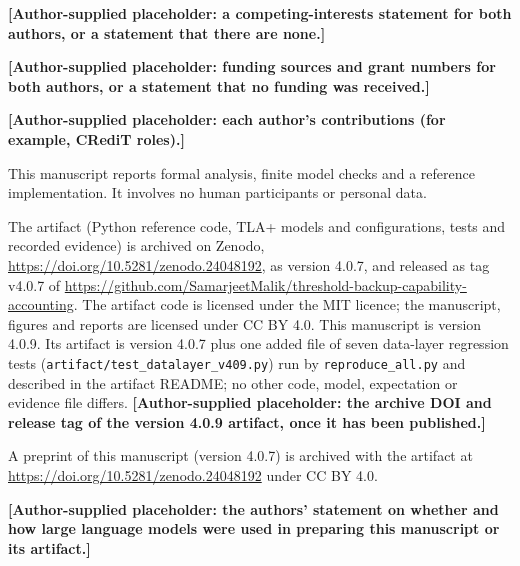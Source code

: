 \documentclass[pdflatex,sn-mathphys-num,twocolumn]{sn-jnl}
\theoremstyle{plain}
\theoremstyle{definition}
\newcommand{\code}[1]{\texttt{#1}}
\newcommand{\authorinput}[1]{\textbf{[Author-supplied placeholder: #1.]}}
\begin{document}
\authorinput{a competing-interests statement for both authors, or a statement that there are none}

\authorinput{funding sources and grant numbers for both authors, or a statement that no funding was received}

\authorinput{each author's contributions (for example, CRediT roles)}

This manuscript reports formal analysis, finite model checks and a reference implementation. It involves no human participants or personal data.

The artifact (Python reference code, TLA+ models and configurations, tests and recorded evidence) is archived on Zenodo, \url{https://doi.org/10.5281/zenodo.24048192}, as version 4.0.7, and released as tag v4.0.7 of \url{https://github.com/SamarjeetMalik/threshold-backup-capability-accounting}. The artifact code is licensed under the MIT licence; the manuscript, figures and reports are licensed under CC BY 4.0. This manuscript is version 4.0.9. Its artifact is version 4.0.7 plus one added file of seven data-layer regression tests (\code{artifact/test\_datalayer\_v409.py}) run by \code{reproduce\_all.py} and described in the artifact README; no other code, model, expectation or evidence file differs. \authorinput{the archive DOI and release tag of the version 4.0.9 artifact, once it has been published}

A preprint of this manuscript (version 4.0.7) is archived with the artifact at \url{https://doi.org/10.5281/zenodo.24048192} under CC BY 4.0.

\authorinput{the authors' statement on whether and how large language models were used in preparing this manuscript or its artifact}
\end{document}
